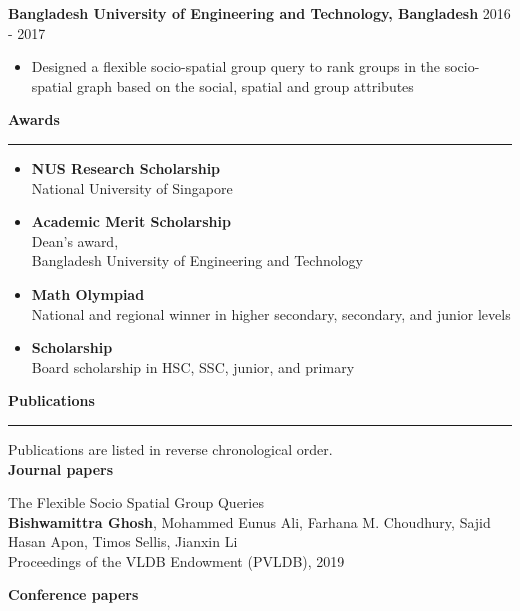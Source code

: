 \documentclass[a4paper,11pt,final]{article}
\newcommand{\Sep}{\vspace{1.5em}}
\newcommand{\SmallSep}{\vspace{0.5em}}
\begin{document}
\SmallSep
\textbf{Bangladesh University of Engineering and Technology, Bangladesh} \hspace*{\fill} 2016  - 2017\\
\begin{itemize}
	\item Designed a flexible socio-spatial group query to rank groups in the socio-spatial graph based on the social, spatial and group attributes
\end{itemize} 


\newpage
\Sep
\Large { \textbf{Awards}}\\
\noindent\rule{\textwidth}{1pt}
\normalsize
\begin{itemize}
	\item  \textbf{NUS Research Scholarship}\\
	National University of Singapore
	\item \textbf{Academic Merit Scholarship }
	\\Dean's award,\\
	Bangladesh University of Engineering and Technology
	\item \textbf{Math Olympiad}\\
	National and regional winner in higher secondary, secondary, and junior levels
	\item \textbf{Scholarship}\\
	Board scholarship in HSC, SSC, junior, and primary
\end{itemize}


\Sep
\Large { \textbf{Publications}}\\
\noindent\rule{\textwidth}{1pt}
\normalsize
Publications are listed in reverse chronological order.\\

\textbf{Journal papers}

	\begin{enumerate}[{[J}1{]}]
		\item 	{The Flexible Socio Spatial Group Queries}\\
		\textbf{Bishwamittra Ghosh}, Mohammed Eunus Ali, Farhana M. Choudhury,
		Sajid Hasan Apon, Timos Sellis, Jianxin Li\\
		Proceedings of the VLDB Endowment (PVLDB), 2019\\
	\end{enumerate}
	

	
	
\SmallSep
\textbf{Conference papers}\\
\end{document}
